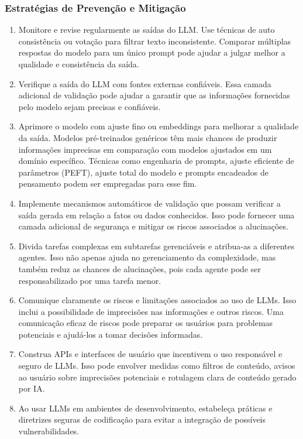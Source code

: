 \documentclass[
]{article}
\providecommand{\tightlist}{%
  \setlength{\itemsep}{0pt}\setlength{\parskip}{0pt}}
\begin{document}
\subsubsection{Estratégias de Prevenção e
Mitigação}\label{estratuxe9gias-de-prevenuxe7uxe3o-e-mitigauxe7uxe3o}

\begin{enumerate}
\def\labelenumi{\arabic{enumi}.}
\tightlist
\item
  Monitore e revise regularmente as saídas do LLM. Use técnicas de auto
  consistência ou votação para filtrar texto inconsistente. Comparar
  múltiplas respostas do modelo para um único prompt pode ajudar a
  julgar melhor a qualidade e consistência da saída.
\item
  Verifique a saída do LLM com fontes externas confiáveis. Essa camada
  adicional de validação pode ajudar a garantir que as informações
  fornecidas pelo modelo sejam precisas e confiáveis.
\item
  Aprimore o modelo com ajuste fino ou embeddings para melhorar a
  qualidade da saída. Modelos pré-treinados genéricos têm mais chances
  de produzir informações imprecisas em comparação com modelos ajustados
  em um domínio específico. Técnicas como engenharia de prompts, ajuste
  eficiente de parâmetros (PEFT), ajuste total do modelo e prompts
  encadeados de pensamento podem ser empregadas para esse fim.
\item
  Implemente mecanismos automáticos de validação que possam verificar a
  saída gerada em relação a fatos ou dados conhecidos. Isso pode
  fornecer uma camada adicional de segurança e mitigar os riscos
  associados a alucinações.
\item
  Divida tarefas complexas em subtarefas gerenciáveis e atribua-as a
  diferentes agentes. Isso não apenas ajuda no gerenciamento da
  complexidade, mas também reduz as chances de alucinações, pois cada
  agente pode ser responsabilizado por uma tarefa menor.
\item
  Comunique claramente os riscos e limitações associados ao uso de LLMs.
  Isso inclui a possibilidade de imprecisões nas informações e outros
  riscos. Uma comunicação eficaz de riscos pode preparar os usuários
  para problemas potenciais e ajudá-los a tomar decisões informadas.
\item
  Construa APIs e interfaces de usuário que incentivem o uso responsável
  e seguro de LLMs. Isso pode envolver medidas como filtros de conteúdo,
  avisos ao usuário sobre imprecisões potenciais e rotulagem clara de
  conteúdo gerado por IA.
\item
  Ao usar LLMs em ambientes de desenvolvimento, estabeleça práticas e
  diretrizes seguras de codificação para evitar a integração de
  possíveis vulnerabilidades.
\end{enumerate}
\end{document}
